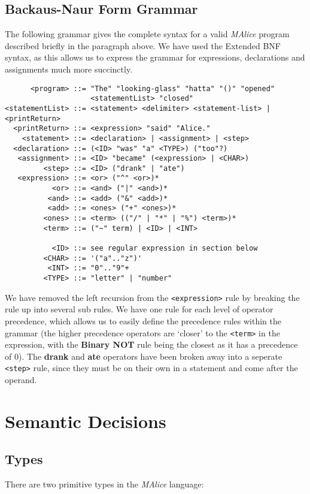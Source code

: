 \documentclass[11pt]{article}
\begin{document}
\subsection*{Backaus-Naur Form Grammar}
The following grammar gives the complete syntax for a valid \emph{MAlice} program described briefly in the paragraph above. We have used the Extended BNF syntax, as this allows us to express the grammar for expressions, declarations and assignments much more succinctly.
\begin{verbatim}
      <program> ::= "The" "looking-glass" "hatta" "()" "opened" 
                    <statementList> "closed"
<statementList> ::= <statement> <delimiter> <statement-list> | <printReturn>
  <printReturn> ::= <expression> "said" "Alice."
    <statement> ::= <declaration> | <assignment> | <step>
  <declaration> ::= (<ID> "was" "a" <TYPE>) ("too"?)
   <assignment> ::= <ID> "became" (<expression> | <CHAR>)
         <step> ::= <ID> ("drank" | "ate")
   <expression> ::= <or> ("^" <or>)*
           <or> ::= <and> ("|" <and>)*
          <and> ::= <add> ("&" <add>)*
          <add> ::= <ones> ("+" <ones>)*
         <ones> ::= <term> (("/" | "*" | "%") <term>)*
         <term> ::= ("~" term) | <ID> | <INT>
         
           <ID> ::= see regular expression in section below
         <CHAR> ::= '("a".."z")'
          <INT> ::= "0".."9"+
         <TYPE> ::= "letter" | "number"
\end{verbatim}

We have removed the left recursion from the \texttt{<expression>} rule by breaking the rule up into several sub rules. We have one rule for each level of operator precedence, which allows us to easily define the precedence rules within the grammar (the higher precedence operators are \textquoteleft closer\textquoteright{} to the \texttt{<term>} in the expression, with the \textbf{Binary NOT} rule being the closest as it has a precedence of 0). The \textbf{drank} and \textbf{ate} operators have been broken away into a seperate \texttt{<step>} rule, since they must be on their own in a statement and come after the operand. 

\section*{Semantic Decisions}
\subsection*{Types}
There are two primitive types in the \emph{MAlice} language:
\end{document}
